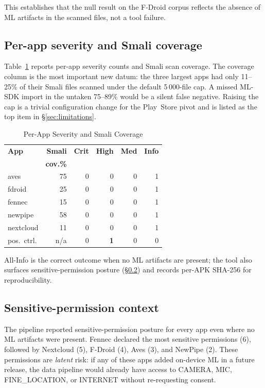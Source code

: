 \documentclass[conference]{IEEEtran}
\begin{document}
This establishes that the null result on the F-Droid corpus reflects
the absence of ML artifacts in the scanned files, not a tool failure.

\subsection{Per-app severity and Smali coverage}
\label{sec:findings_coverage}

Table~\ref{tab:findings} reports per-app severity counts and Smali
scan coverage. The coverage column is the most important new datum:
the three largest apps had only 11--25\% of their Smali files scanned
under the default 5\,000-file cap. A missed ML-SDK import in the
untaken 75--89\% would be a silent false negative. Raising the cap is
a trivial configuration change for the Play~Store pivot and is listed
as the top item in \S\ref{sec:limitations}.

\begin{table}[htbp]
\caption{Per-App Severity and Smali Coverage}
\label{tab:findings}
\centering
\footnotesize
\begin{tabular}{@{}lrrrrr@{}}
\toprule
\textbf{App} & \textbf{Smali} & \textbf{Crit} & \textbf{High} & \textbf{Med} & \textbf{Info} \\
 & \textbf{cov.\%} & & & & \\
\midrule
aves & 75 & 0 & 0 & 0 & 1 \\
fdroid & 25 & 0 & 0 & 0 & 1 \\
fennec & 15 & 0 & 0 & 0 & 1 \\
newpipe & 58 & 0 & 0 & 0 & 1 \\
nextcloud & 11 & 0 & 0 & 0 & 1 \\
pos.\ ctrl. & n/a & 0 & \textbf{1} & 0 & 0 \\
\bottomrule
\end{tabular}
\end{table}

All-Info is the correct outcome when no ML artifacts are present; the
tool also surfaces sensitive-permission posture
(\S\ref{sec:findings_perms}) and records per-APK SHA-256 for
reproducibility.

\subsection{Sensitive-permission context}
\label{sec:findings_perms}

The pipeline reported sensitive-permission posture for every app even
where no ML artifacts were present. Fennec declared the most
sensitive permissions (6), followed by Nextcloud (5), F-Droid (4),
Aves (3), and NewPipe (2). These permissions are \emph{latent} risk:
if any of these apps added on-device ML in a future release, the data
pipeline would already have access to CAMERA, MIC, FINE\_LOCATION, or
INTERNET without re-requesting consent.
\end{document}
